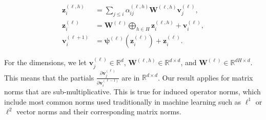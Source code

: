 \documentclass{article} %
\newcommand{\vb}{\mathbf{v}}
\newcommand{\zb}{\mathbf{z}}
\newcommand{\psib}{\boldsymbol{\psi}}
\newcommand{\Wb}{\mathbf{W}}
\newcommand{\R}{\mathbb{R}}
\begin{document}
\begin{align*}
\label{eq:transformer}
\zb^{(\ell, h)}_i &= \sum_{j \leq i} \alpha_{ij}^{(\ell, h)} \Wb^{(\ell, h)} \vb^{(\ell)}_j,\\
\zb^{(\ell)}_i &= \Wb^{(\ell)}\bigoplus_{h \in H} \zb_i^{(\ell , h)} + \vb^{(\ell)}_i,\\
\vb_i^{(\ell+1)} &= \psib^{(\ell)}\left(\zb_i^{(\ell)}\right) + \zb_i^{(\ell)}.
\end{align*}

For the dimensions, we let $\vb_j^{(\ell)} \in \R^d$, $\Wb^{(\ell, h)} \in \R^{d \times d}$, and $\Wb^{(\ell)} \in \R^{dH \times d}$. This means that the partials $\frac{\partial \vb^{(\ell)}_j}{\partial \vb^{(\ell-1)}_i}$ are in $\R^{d \times d}$. Our result applies for matrix norms that are sub-multiplicative. This is true for induced operator norms, which include most common norms used traditionally in machine learning such as $\ell^1$ or $\ell^2$ vector norms and their corresponding matrix norms.
\end{document}
